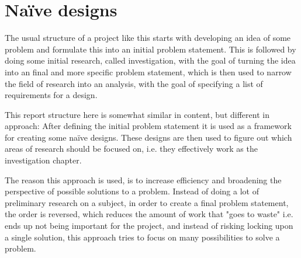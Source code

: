 \section{Naïve designs}
The usual structure of a project like this starts with developing an idea of some problem and formulate this into an initial problem statement. This is followed by doing some initial research, called investigation, with the goal of turning the idea into an final and more specific problem statement, which is then used to narrow the field of research into an analysis, with the goal of specifying a list of requirements for a design.

This report structure here is somewhat similar in content, but different in approach:
After defining the initial problem statement it is used as a framework for creating some naïve designs. These designs are then used to figure out which areas of research should be focused on, i.e. they effectively work as the investigation chapter.
\bigskip

The reason this approach is used, is to increase efficiency and broadening the perspective of possible solutions to a problem. Instead of doing a lot of preliminary research on a subject, in order to create a final problem statement, the order is reversed, which reduces the amount of work that "goes to waste" i.e. ends up not being important for the project, and instead of risking locking upon a single solution, this approach tries to focus on many possibilities to solve a problem.



